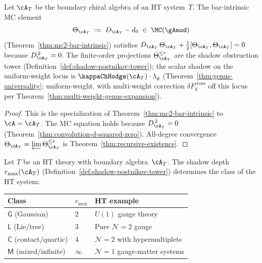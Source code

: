 \begin{theorem}
\label{thm:ht-mc-all-genera}
Let $\cA_T$ be the boundary chiral algebra of an HT system~$T$.
The bar-intrinsic MC element
\begin{equation}\label{eq:ht-theta}
\Theta_{\cA_T}
\;:=\; D_{\cA_T} - d_0
\;\in\; \MC(\gAmod)
\end{equation}
\textup{(}Theorem~\textup{\ref{thm:mc2-bar-intrinsic}}\textup{)}
satisfies
$D_{\cA_T}\,\Theta_{\cA_T}
+ \tfrac{1}{2}[\Theta_{\cA_T},\Theta_{\cA_T}] = 0$
because $D_{\cA_T}^{\,2} = 0$. The finite-order projections
$\Theta_{\cA_T}^{\leq r}$ are the shadow obstruction tower
\textup{(}Definition~\textup{\ref{def:shadow-postnikov-tower}}\textup{)};
the scalar shadow on the uniform-weight locus is
$\kappaChHodge(\cA_T) \cdot \lambda_g$
\textup{(}Theorem~\textup{\ref{thm:genus-universality}};
uniform-weight, with multi-weight correction
$\delta F_g^{\mathrm{cross}}$
off this locus per
Theorem~\textup{\ref{thm:multi-weight-genus-expansion}}\textup{)}.
\end{theorem}

\begin{proof}
This is the specialization of
Theorem~\ref{thm:mc2-bar-intrinsic} to $\cA = \cA_T$. The MC
equation holds because $D_{\cA_T}^{\,2} = 0$
(Theorem~\ref{thm:convolution-d-squared-zero}). All-degree
convergence $\Theta_{\cA_T} = \varprojlim \Theta_{\cA_T}^{\leq r}$
is Theorem~\ref{thm:recursive-existence}.
\end{proof}

\begin{corollary}
\label{cor:ht-shadow-archetype}
Let $T$ be an HT theory with boundary algebra~$\cA_T$. The shadow
depth~$r_{\max}(\cA_T)$
\textup{(}Definition~\textup{\ref{def:shadow-postnikov-tower}}\textup{)}
determines the class of the HT system:
\begin{center}
\renewcommand{\arraystretch}{1.2}
\begin{tabular}{lll}
\toprule
\textbf{Class} & $r_{\max}$ & \textbf{HT example} \\
\midrule
$\mathsf{G}$ (Gaussian) & $2$ & $U(1)$ gauge theory \\
$\mathsf{L}$ (Lie/tree) & $3$ & Pure $\mathcal{N}=2$ gauge \\
$\mathsf{C}$ (contact/quartic) & $4$ &
 $\mathcal{N}=2$ with hypermultiplets \\
$\mathsf{M}$ (mixed/infinite) & $\infty$ &
 $\mathcal{N}=1$ gauge-matter systems \\
\bottomrule
\end{tabular}
\end{center}
\end{corollary}


